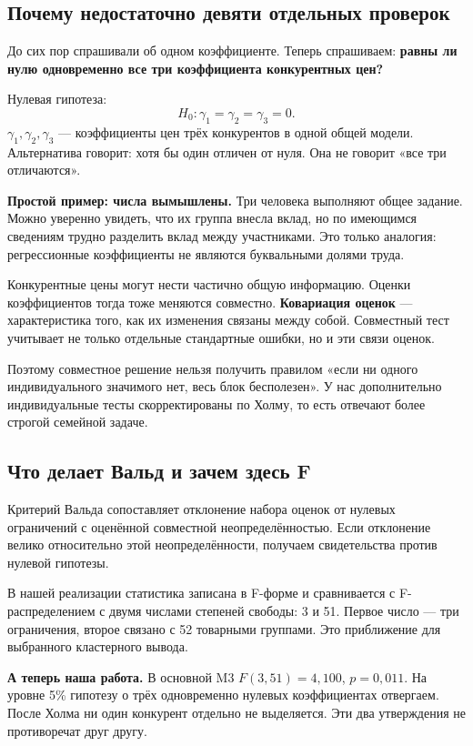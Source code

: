 \documentclass[12pt,a4paper]{article}
\newcommand{\toy}[1]{\par\textbf{Простой пример: числа вымышлены.} #1\par}
\newcommand{\ours}[1]{\par\textbf{А теперь наша работа.} #1\par}
\begin{document}
\subsection{Почему недостаточно девяти отдельных проверок}

До сих пор спрашивали об одном коэффициенте. Теперь спрашиваем: \textbf{равны ли нулю одновременно все три коэффициента конкурентных цен?}

Нулевая гипотеза:
\[
 H_0:\gamma_1=\gamma_2=\gamma_3=0.
\]
$\gamma_1,\gamma_2,\gamma_3$ --- коэффициенты цен трёх конкурентов в одной общей модели. Альтернатива говорит: хотя бы один отличен от нуля. Она не говорит «все три отличаются».

\toy{Три человека выполняют общее задание. Можно уверенно увидеть, что их группа внесла вклад, но по имеющимся сведениям трудно разделить вклад между участниками. Это только аналогия: регрессионные коэффициенты не являются буквальными долями труда.}

Конкурентные цены могут нести частично общую информацию. Оценки коэффициентов тогда тоже меняются совместно. \textbf{Ковариация оценок} --- характеристика того, как их изменения связаны между собой. Совместный тест учитывает не только отдельные стандартные ошибки, но и эти связи оценок.

Поэтому совместное решение нельзя получить правилом «если ни одного индивидуального значимого нет, весь блок бесполезен». У нас дополнительно индивидуальные тесты скорректированы по Холму, то есть отвечают более строгой семейной задаче.

\subsection{Что делает Вальд и зачем здесь F}

Критерий Вальда сопоставляет отклонение набора оценок от нулевых ограничений с оценённой совместной неопределённостью. Если отклонение велико относительно этой неопределённости, получаем свидетельства против нулевой гипотезы.

В нашей реализации статистика записана в F-форме и сравнивается с F-распределением с двумя числами степеней свободы: 3 и 51. Первое число --- три ограничения, второе связано с 52 товарными группами. Это приближение для выбранного кластерного вывода.

\ours{В основной M3 $F(3,51)=4{,}100$, $p=0{,}011$. На уровне 5\% гипотезу о трёх одновременно нулевых коэффициентах отвергаем. После Холма ни один конкурент отдельно не выделяется. Эти два утверждения не противоречат друг другу.}
\end{document}
